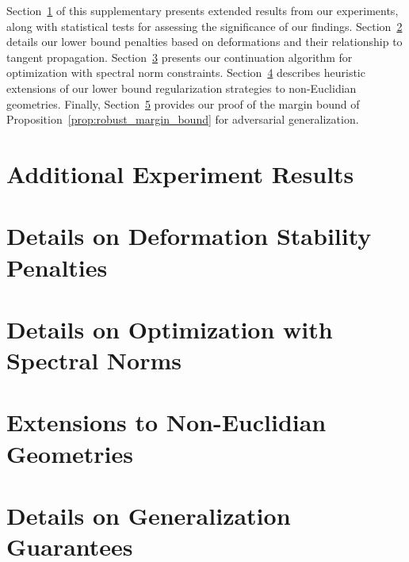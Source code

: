 \documentclass{article}
\begin{document}



\newpage

\appendix
\onecolumn


Section~\ref{sec:experiments_appx} of this supplementary presents extended results
from our experiments, along with statistical tests for assessing the significance of our findings.
Section~\ref{sec:deformation_penalties} details our lower bound penalties based on deformations
and their relationship to tangent propagation.
Section~\ref{sec:spectral_norms_appx} presents our continuation algorithm for optimization
with spectral norm constraints.
Section~\ref{sec:non_euclidian_appx} describes
heuristic extensions of our lower bound regularization strategies to non-Euclidian geometries.
Finally, Section~\ref{sec:generalization_appx} provides our proof of the margin bound
of Proposition~\ref{prop:robust_margin_bound} for adversarial generalization.

\section{Additional Experiment Results}
\label{sec:experiments_appx}


\clearpage

\section{Details on Deformation Stability Penalties}
\label{sec:deformation_penalties}


\section{Details on Optimization with Spectral Norms}
\label{sec:spectral_norms_appx}


\section{Extensions to Non-Euclidian Geometries}
\label{sec:non_euclidian_appx}


\section{Details on Generalization Guarantees}
\label{sec:generalization_appx}

\end{document}
